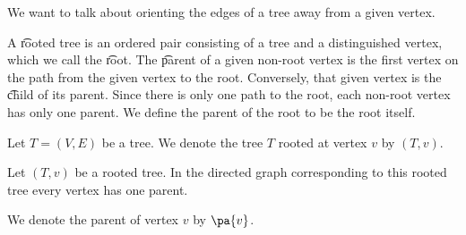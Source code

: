 
\sbasic












\sstart
{}


We want to talk about orienting the edges of a tree away from a given vertex.


A \t{rooted tree} is an ordered pair consisting of a tree and a distinguished vertex, which we call the \t{root}.
The \t{parent} of a given non-root vertex is the first vertex on the path from the given vertex to the root.
Conversely, that given vertex is the \t{child} of its parent.
Since there is only one path to the root, each non-root vertex has only one parent.
We define the parent of the root to be the root itself.

%

Let $T = (V, E)$ be a tree.
We denote the tree $T$ rooted at vertex $v$ by $(T, v)$.


\begin{prop}
Let $(T, v)$ be a rooted tree.
In the directed graph corresponding to this rooted tree every vertex has one parent.
\end{prop}

We denote the parent of vertex $v$ by $\pa{v}$.
\strats
